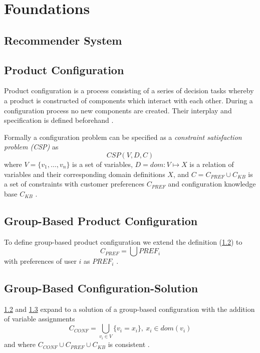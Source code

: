 \chapter{Foundations}
\label{ch:Foundations}

\section{Recommender System}
\label{Foundations:RecommenderSystem}

\section{Product Configuration}
\label{Foundations:ProductConfiguration}

Product configuration is a process consisting of a series of decision tasks whereby a product is constructed of components which interact with each other. During a configuration process no new components are created. Their interplay and specification is defined beforehand \cite[~ p. 42-43]{sabinProductConfigurationFrameworksa1998}.

Formally a configuration problem can be specified as a \emph{constraint satisfaction problem (CSP)} \cite{tsangFoundationsConstraintSatisfaction1993} as 
\[
    CSP(V,D,C)
\]
where \( V = \{v_1,\dots, v_n\} \) is a set of variables, \( D = dom : V \mapsto X \) is a relation of variables and their corresponding domain definitions \( X \), and \( C = C_{PREF} \cup C_{KB} \) is a set of constraints with customer preferences \( C_{PREF} \) and configuration knowledge base \( C_{KB} \) \cite{felfernigOpenConfiguration2014, felferningGroupBasedConfiguration2016}.


\section{Group-Based Product Configuration}
\label{Foundations:GroupBasedProductConfiguration}

To define group-based product configuration we extend the definition (\ref{Foundations:ProductConfiguration}) to 
\[ 
    C_{PREF} = \bigcup 
PREF_i \]
with preferences of user \( i \) as \( PREF_i \) \cite{ felferningGroupBasedConfiguration2016}.

\section{Group-Based Configuration-Solution}
\label{Foundations:GroupBasedConfigurationSolution}

\ref{Foundations:ProductConfiguration} and \ref{Foundations:GroupBasedProductConfiguration} expand to a solution of a group-based configuration with the addition of variable assignments
\[
    C_{CONF} = \bigcup_{v_i \in V} \{ v_i = x_i \}, \ x_i \in dom(v_i)
\]
and where \( C_{CONF} \cup C_{PREF} \cup C_{KB} \) is consistent \cite{ felferningGroupBasedConfiguration2016}.



